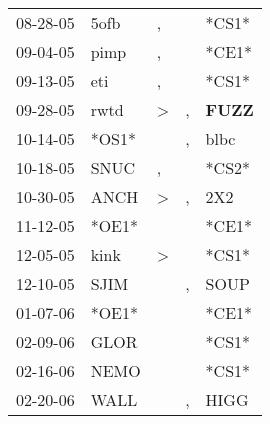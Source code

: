 \begin{supertabular}{p{0.07\textwidth}p{0.06\textwidth}p{0.02\textwidth}p{0.02\textwidth}p{0.06\textwidth}}
          08-28-05\textsuperscript{} &           5ofb\textsuperscript{} &                , &                  &                            *CS1* \\
          09-04-05\textsuperscript{} &           pimp\textsuperscript{} &                , &                  &                            *CE1* \\
          09-13-05\textsuperscript{} &            eti\textsuperscript{} &                , &                  &                            *CS1* \\
          09-28-05\textsuperscript{} &           rwtd\textsuperscript{} &     \textgreater &                , &  \textbf{FUZZ\textsuperscript{}} \\
          10-14-05\textsuperscript{} &                            *OS1* &                  &                , &           blbc\textsuperscript{} \\
          10-18-05\textsuperscript{} &           SNUC\textsuperscript{} &                , &                  &                            *CS2* \\
          10-30-05\textsuperscript{} &           ANCH\textsuperscript{} &     \textgreater &                , &            2X2\textsuperscript{} \\
          11-12-05\textsuperscript{} &                            *OE1* &                  &                  &                            *CE1* \\
          12-05-05\textsuperscript{} &           kink\textsuperscript{} &     \textgreater &                  &                            *CS1* \\
          12-10-05\textsuperscript{} &           SJIM\textsuperscript{} &                  &                , &           SOUP\textsuperscript{} \\
          01-07-06\textsuperscript{} &                            *OE1* &                  &                  &                            *CE1* \\
          02-09-06\textsuperscript{} &           GLOR\textsuperscript{} &                  &                  &                            *CS1* \\
          02-16-06\textsuperscript{} &           NEMO\textsuperscript{} &                  &                  &                            *CS1* \\
          02-20-06\textsuperscript{} &           WALL\textsuperscript{} &                  &                , &           HIGG\textsuperscript{} \\

\end{supertabular}
